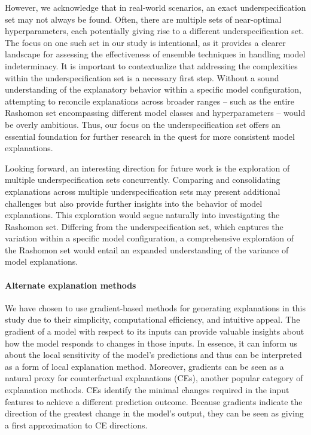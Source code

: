 However, we acknowledge that in real-world scenarios, an exact underspecification set may not always be found. Often, there are multiple sets of near-optimal hyperparameters, each potentially giving rise to a different underspecification set. The focus on one such set in our study is intentional, as it provides a clearer landscape for assessing the effectiveness of ensemble techniques in handling model indeterminacy. It is important to contextualize that addressing the complexities within the underspecification set is a necessary first step. Without a sound understanding of the explanatory behavior within a specific model configuration, attempting to reconcile explanations across broader ranges – such as the entire Rashomon set encompassing different model classes and hyperparameters – would be overly ambitious. Thus, our focus on the underspecification set offers an essential foundation for further research in the quest for more consistent model explanations.

Looking forward, an interesting direction for future work is the exploration of multiple underspecification sets concurrently. Comparing and consolidating explanations across multiple underspecification sets may present additional challenges but also provide further insights into the behavior of model explanations. This exploration would segue naturally into investigating the Rashomon set. Differing from the underspecification set, which captures the variation within a specific model configuration, a comprehensive exploration of the Rashomon set would entail an expanded understanding of the variance of model explanations.

\paragraph{Alternate explanation methods} We have chosen to use gradient-based methods for generating explanations in this study due to their simplicity, computational efficiency, and intuitive appeal. The gradient of a model with respect to its inputs can provide valuable insights about how the model responds to changes in those inputs. In essence, it can inform us about the local sensitivity of the model's predictions and thus can be interpreted as a form of local explanation method. Moreover, gradients can be seen as a natural proxy for counterfactual explanations (CEs), another popular category of explanation methods. CEs identify the minimal changes required in the input features to achieve a different prediction outcome. Because gradients indicate the direction of the greatest change in the model's output, they can be seen as giving a first approximation to CE directions.

